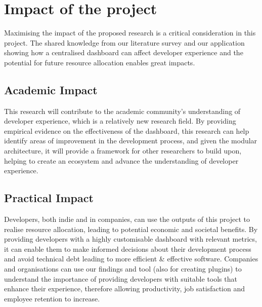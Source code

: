\documentclass{prrcs}
\begin{document}
\section{Impact of the project}



Maximising the impact of the proposed research is a critical consideration in this project. The shared knowledge from our literature survey and our application showing how a centralised dashboard can affect developer experience and the potential for future resource allocation enables great impacts.

\subsection*{Academic Impact}

This research will contribute to the academic community's understanding of developer experience, which is a relatively new research field. By providing empirical evidence on the effectiveness of the dashboard, this research can help identify areas of improvement in the development process, and given the modular architecture, it will provide a framework for other researchers to build upon, helping to create an ecosystem and advance the understanding of developer experience.

\subsection*{Practical Impact}

Developers, both indie and in companies, can use the outputs of this project to realise resource allocation, leading to potential economic and societal benefits. By providing developers with a highly customisable dashboard with relevant metrics, it can enable them to make informed decisions about their development process and avoid technical debt leading to more efficient \& effective software. Companies and organisations can use our findings and tool (also for creating plugins) to understand the importance of providing developers with suitable tools that enhance their experience, therefore allowing productivity, job satisfaction and employee retention to increase.

\let\oldbibliography\thebibliography
\renewcommand{\thebibliography}[1]{\oldbibliography{#1}
\setlength{\itemsep}{-3pt}}

% 
{
\renewcommand*{\bibfont}{\scriptsize}
\printbibliography
}
\end{document}
